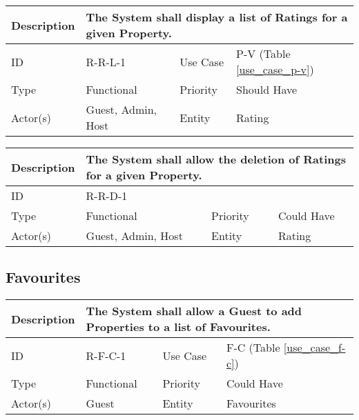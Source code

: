 \begin{tabular}{|p{1.5cm}|p{1.5cm}|p{1.5cm}|p{1.5cm}|p{1.5cm}|p{1.5cm}|p{1.5cm}|p{1.5cm}|p{1.5cm}|p{1.5cm}|p{1.5cm}|p{1.5cm}|}
    \hline
    \multicolumn{2}{|o|}{Description} & \multicolumn{10}{p{12.5cm}|}{The System shall display a list of Ratings for a given Property.} \\ \hline
    \multicolumn{2}{|o|}{ID}          & \multicolumn{4}{n}{R-R-L-1}            & \multicolumn{2}{|o|}{Use Case}    & \multicolumn{4}{n|}{P-V (Table \ref{use_case_p-v})} \\ \hline
    \multicolumn{2}{|o|}{Type}        & \multicolumn{4}{n}{Functional}         & \multicolumn{2}{|o|}{Priority}    & \multicolumn{4}{n|}{Should Have}  \\ \hline
    \multicolumn{2}{|o|}{Actor(s)}    & \multicolumn{4}{n}{Guest, Admin, Host} & \multicolumn{2}{|o|}{Entity}      & \multicolumn{4}{n|}{Rating} \\ \hline
\end{tabular}

\begin{tabular}{|p{1.5cm}|p{1.5cm}|p{1.5cm}|p{1.5cm}|p{1.5cm}|p{1.5cm}|p{1.5cm}|p{1.5cm}|p{1.5cm}|p{1.5cm}|p{1.5cm}|p{1.5cm}|}
    \hline
    \multicolumn{2}{|o|}{Description} & \multicolumn{10}{p{12.5cm}|}{The System shall allow the deletion of Ratings for a given Property.} \\ \hline
    \multicolumn{2}{|o|}{ID}          & \multicolumn{10}{p{12.5cm}|}{R-R-D-1}        \\ \hline
    \multicolumn{2}{|o|}{Type}        & \multicolumn{4}{n}{Functional}         & \multicolumn{2}{|o|}{Priority}    & \multicolumn{4}{n|}{Could Have}  \\ \hline
    \multicolumn{2}{|o|}{Actor(s)}    & \multicolumn{4}{n}{Guest, Admin, Host} & \multicolumn{2}{|o|}{Entity}      & \multicolumn{4}{n|}{Rating} \\ \hline
\end{tabular}

\subsection{Favourites}

\begin{tabular}{|p{1.5cm}|p{1.5cm}|p{1.5cm}|p{1.5cm}|p{1.5cm}|p{1.5cm}|p{1.5cm}|p{1.5cm}|p{1.5cm}|p{1.5cm}|p{1.5cm}|p{1.5cm}|}
    \hline
    \multicolumn{2}{|o|}{Description} & \multicolumn{10}{p{12.5cm}|}{The System shall allow a Guest to add Properties to a list of Favourites.} \\ \hline
    \multicolumn{2}{|o|}{ID}          & \multicolumn{4}{n}{R-F-C-1}            & \multicolumn{2}{|o|}{Use Case}    & \multicolumn{4}{n|}{F-C (Table \ref{use_case_f-c})} \\ \hline
    \multicolumn{2}{|o|}{Type}        & \multicolumn{4}{n}{Functional}         & \multicolumn{2}{|o|}{Priority}    & \multicolumn{4}{n|}{Could Have}  \\ \hline
    \multicolumn{2}{|o|}{Actor(s)}    & \multicolumn{4}{n}{Guest}              & \multicolumn{2}{|o|}{Entity}      & \multicolumn{4}{n|}{Favourites} \\ \hline
\end{tabular}

